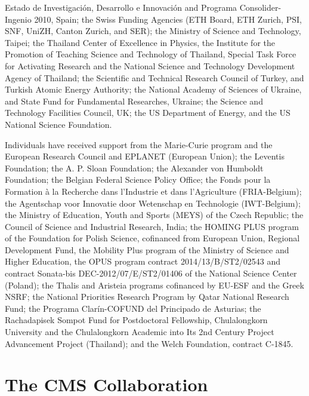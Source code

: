 \documentclass[11pt,twoside,a4paper,cmspaper,final,collab]{cms-tdr}
\begin{document}
\begin{acknowledgments}
Estado de Investigaci\'on, Desarrollo e Innovaci\'on and Programa Consolider-Ingenio 2010, Spain; the Swiss Funding Agencies (ETH Board, ETH Zurich, PSI, SNF, UniZH, Canton Zurich, and SER); the Ministry of Science and Technology, Taipei; the Thailand Center of Excellence in Physics, the Institute for the Promotion of Teaching Science and Technology of Thailand, Special Task Force for Activating Research and the National Science and Technology Development Agency of Thailand; the Scientific and Technical Research Council of Turkey, and Turkish Atomic Energy Authority; the National Academy of Sciences of Ukraine, and State Fund for Fundamental Researches, Ukraine; the Science and Technology Facilities Council, UK; the US Department of Energy, and the US National Science Foundation.

Individuals have received support from the Marie-Curie program and the European Research Council and EPLANET (European Union); the Leventis Foundation; the A. P. Sloan Foundation; the Alexander von Humboldt Foundation; the Belgian Federal Science Policy Office; the Fonds pour la Formation \`a la Recherche dans l'Industrie et dans l'Agriculture (FRIA-Belgium); the Agentschap voor Innovatie door Wetenschap en Technologie (IWT-Belgium); the Ministry of Education, Youth and Sports (MEYS) of the Czech Republic; the Council of Science and Industrial Research, India; the HOMING PLUS program of the Foundation for Polish Science, cofinanced from European Union, Regional Development Fund, the Mobility Plus program of the Ministry of Science and Higher Education, the OPUS program contract 2014/13/B/ST2/02543 and contract Sonata-bis DEC-2012/07/E/ST2/01406 of the National Science Center (Poland); the Thalis and Aristeia programs cofinanced by EU-ESF and the Greek NSRF; the National Priorities Research Program by Qatar National Research Fund; the Programa Clar\'in-COFUND del Principado de Asturias; the Rachadapisek Sompot Fund for Postdoctoral Fellowship, Chulalongkorn University and the Chulalongkorn Academic into Its 2nd Century Project Advancement Project (Thailand); and the Welch Foundation, contract C-1845.

\end{acknowledgments}

\clearpage



\cleardoublepage \appendix\section{The CMS Collaboration \label{app:collab}}\begin{sloppypar}\end{sloppypar}
\end{document}
